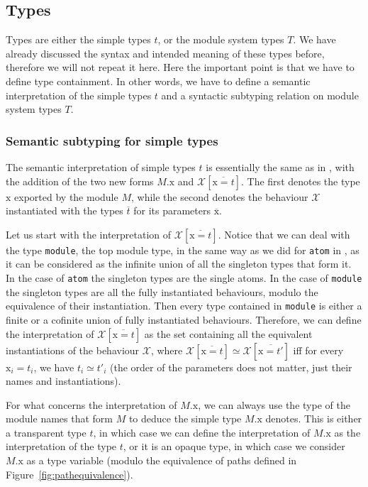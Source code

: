 \documentclass[a4paper,10pt]{article}
\newcommand{\tx}{\textrm{x}}
\newcommand{\BX}{\ensuremath{\mathcal{X}}}
\begin{document}
\subsection{Types}

Types are either the simple types $t$, or the module system types $T$. We have already discussed the syntax and intended meaning of these types before, therefore we will not repeat it here. Here the important point is that we have to define type containment. In other words, we have to define a semantic interpretation of the simple types $t$ and a syntactic subtyping relation on module system types $T$. 

\subsubsection{Semantic subtyping for simple types}
The semantic interpretation of simple types $t$ is essentially the same as in \cite{CDV24,CD25}, with the addition of the two new forms $M.\tx$ and $\BX[\overline{\tx=t}]$. The first denotes the type $\tx$ exported by the module $M$, while the second denotes the behaviour $\BX$ instantiated with the types $\overline{t}$ for its parameters $\overline{\tx}$.

Let us start with the interpretation of $\BX[\overline{\tx=t}]$. Notice that we can deal with the type \texttt{module}, the top module type, in the same way as we did for \texttt{atom} in \cite{CD25}, as it can be considered as the infinite union of all the singleton types that form it. In the case of \texttt{atom} the singleton types are the single atoms. In the case of \texttt{module} the singleton types are all the fully instantiated behaviours, modulo the equivalence of their instantiation. Then every type contained in \texttt{module} is either a finite or a cofinite union of fully instantiated behaviours.
Therefore, we can define the interpretation of $\BX[\overline{\tx=t}]$ as the set containing all the equivalent instantiations of the behaviour $\BX$, where $\BX[\overline{\tx=t}]\simeq\BX[\overline{\tx=t'}]$ iff for every $\tx_i=t_i$, we have $t_i\simeq t'_i$ (the order of the parameters does not matter, just their names and instantiations).

For what concerns the interpretation of $M.\tx$, we can always use the type of the module names that form $M$ to deduce the simple type $M.\tx$ denotes. This is either a transparent type $t$, in which case we can define the interpretation of $M.\tx$ as the interpretation of the type $t$, or it is an opaque type, in which case we consider $M.\tx$ as a type variable (modulo the equivalence of paths defined in Figure~\ref{fig:pathequivalence}).
\end{document}
